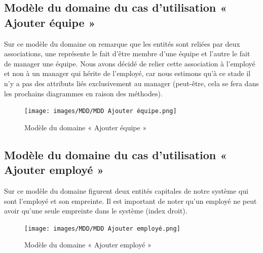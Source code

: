 \begin{itemize}
        \subsection*{Modèle du domaine du cas d'utilisation « Ajouter équipe »}
        Sur ce modèle du domaine on remarque que les entités sont reliées par deux associations, une représente le fait d’être membre d’une équipe et l’autre le fait de manager une équipe. Nous avons décidé de relier cette association à l’employé et non à un manager qui hérite de l’employé, car nous estimons qu’à ce stade il n’y a pas des attributs liés exclusivement au manager (peut-être, cela se fera dans les prochains diagrammes en raison des méthodes).   
            \begin{figure}[h!]
                 \centering
                \texttt{[image: images/MDD/MDD Ajouter équipe.png]}
                 \caption{Modèle du domaine « Ajouter équipe »}
                 \label{fig15}
            \end{figure}
            
        \subsection*{Modèle du domaine du cas d'utilisation « Ajouter employé »}
        Sur ce modèle du domaine figurent deux entités capitales de notre système qui sont l’employé et son empreinte. Il est important de noter qu’un employé ne peut avoir qu’une seule empreinte dans le système (index droit).
        \clearpage
            \begin{figure}[h!]
                 \centering
                \texttt{[image: images/MDD/MDD Ajouter employé.png]}
                 \caption{Modèle du domaine « Ajouter employé »}
                 \label{fig16}
            \end{figure}
            

\end{itemize}
